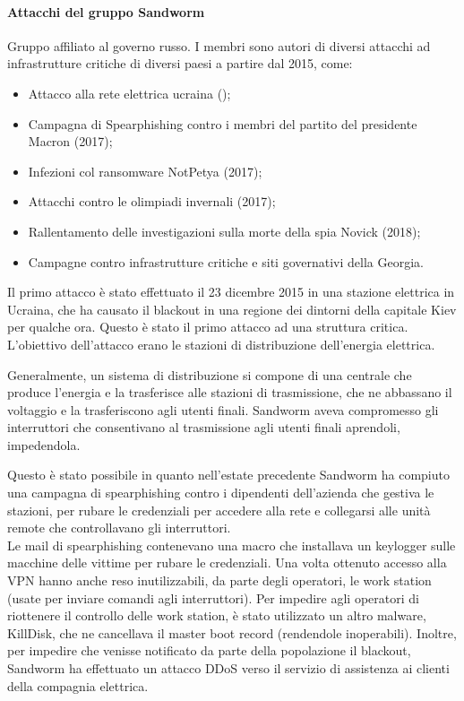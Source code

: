 \paragraph{Attacchi del gruppo Sandworm} Gruppo affiliato al governo russo. I membri sono autori di diversi attacchi ad infrastrutture critiche di diversi paesi a partire dal 2015, come:
\begin{itemize}
    \item Attacco alla rete elettrica ucraina ();
    \item Campagna di Spearphishing contro i membri del partito del presidente Macron (2017);
    \item Infezioni col ransomware NotPetya (2017);
    \item Attacchi contro le olimpiadi invernali (2017);
    \item Rallentamento delle investigazioni sulla morte della spia Novick (2018);
    \item Campagne contro infrastrutture critiche e siti governativi della Georgia.
\end{itemize}

\noindent Il primo attacco è stato effettuato il 23 dicembre 2015 in una stazione elettrica in Ucraina, che ha causato il blackout in una regione dei dintorni della capitale Kiev per qualche ora. Questo è stato il primo attacco ad una struttura critica.
L'obiettivo dell'attacco erano le stazioni di distribuzione dell'energia elettrica. 

Generalmente, un sistema di distribuzione si compone di una centrale che produce l'energia e la trasferisce alle stazioni di trasmissione, che ne abbassano il voltaggio e la trasferiscono agli utenti finali. Sandworm aveva compromesso gli interruttori che consentivano al trasmissione agli utenti finali aprendoli, impedendola.

Questo è stato possibile in quanto nell'estate precedente Sandworm ha compiuto una campagna di spearphishing contro i dipendenti dell'azienda che gestiva le stazioni, per rubare le credenziali per accedere alla rete e collegarsi alle unità remote che controllavano gli interruttori. 
\\

\noindent Le mail di spearphishing contenevano una macro che installava un keylogger sulle macchine delle vittime per rubare le credenziali. Una volta ottenuto accesso alla VPN hanno anche reso inutilizzabili, da parte degli operatori, le work station (usate per inviare comandi agli interruttori). Per impedire agli operatori di riottenere il controllo delle work station, è stato utilizzato un altro malware, KillDisk, che  ne cancellava il master boot record (rendendole inoperabili). Inoltre, per impedire che venisse notificato da parte della popolazione il blackout, Sandworm ha effettuato un attacco DDoS verso il servizio di assistenza ai clienti della compagnia elettrica. 

